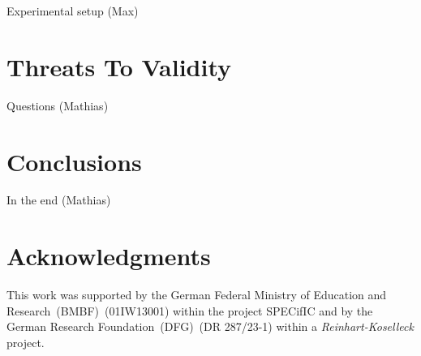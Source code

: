 \documentclass[conference]{IEEEtran}
\begin{document}
\danger Experimental setup (Max)

\section{Threats To Validity}
\label{sec:threats-validity}

\danger Questions (Mathias)

\section{Conclusions}
\label{sec:conclusions}

\danger In the end (Mathias)

\section*{Acknowledgments}
\label{sec:acknowledgments}
This work was supported by the German Federal Ministry of Education and
Research~(BMBF)~(01IW13001) within the project SPECifIC and by the German
Research Foundation~(DFG)~(DR 287/23-1) within a \emph{Reinhart-Koselleck}
project.


%
%
\end{document}
